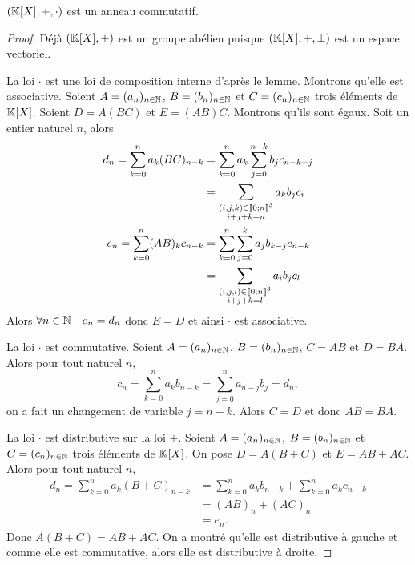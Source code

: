 \begin{theo}
  \((\mathbb{K}[X],+,\cdot)\) est un anneau commutatif.
\end{theo}
\begin{proof}
  Déjà \((\mathbb{K}[X],+)\) est un groupe abélien puisque \((\mathbb{K}[X],+,\perp)\) est un
  espace vectoriel.

  La loi \(\cdot\) est une loi de composition interne d'après le lemme. Montrons
  qu'elle est associative. Soient \(A = (a_n)_{n \in \mathbb{N}}\), \(B = (b_n)_{n \in \mathbb{N}}\)
  et \(C = (c_n)_{n \in \mathbb{N}}\) trois éléments de \(\mathbb{K}[X]\). Soient \(D = A(BC)\) et
  \(E = (AB)C\). Montrons qu'ils sont égaux. Soit un entier naturel \(n\), alors
  \begin{align}
    d_n = \sum_{k = 0}^n a_k (BC)_{n-k} &= \sum_{k = 0}^n a_k \sum_{j = 0}^{n-k} b_j
    c_{n-k-j} \\
    & = \sum_{\substack{(i,j,k)\in \mathopen{\llbracket}0\mathclose{}\mathpunct{};n\mathclose{\rrbracket}^3 \\  i+j+k = n}} a_k b_j
    c_i \\
    e_n = \sum_{k = 0}^n (AB)_k c_{n-k} &= \sum_{k = 0}^n \sum_{j = 0}^{k} a_j
    b_{k-j} c_{n-k} \\
    & = \sum_{\substack{(i,j,l)\in \mathopen{\llbracket}0\mathclose{}\mathpunct{};n\mathclose{\rrbracket}^3 \\  i+j+k = l}} a_i b_j
    c_l \\
  \end{align}
  Alors \(\forall n \in \mathbb{N} \quad e_n = d_n\) donc \(E = D\) et ainsi \(\cdot\) est
  associative.

  La loi \(\cdot\) est commutative. Soient \(A = (a_n)_{n \in \mathbb{N}}\), \(B = (b_n)_{n
  \in \mathbb{N}}\), \(C = AB\) et \(D = BA\). Alors pour tout naturel \(n\),
  \begin{equation}
    c_n = \sum_{k = 0}^n a_k b_{n-k} = \sum_{j = 0}^n a_{n-j} b_{j} =d_n,
  \end{equation}
  on a fait un changement de variable \(j = n-k\). Alors \(C = D\) et donc
  \(AB = BA\).

  La loi \(\cdot\) est distributive sur la loi \(+\). Soient \(A = (a_n)_{n \in
  \mathbb{N}}\), \(B = (b_n)_{n \in \mathbb{N}}\) et \(C = (c_n)_{n \in \mathbb{N}}\) trois éléments de
  \(\mathbb{K}[X]\). On pose \(D = A(B+C)\) et \(E = AB+AC\). Alors pour tout naturel \(n\),
  \begin{align}
    d_n = \sum_{k = 0}^n a_k(B+C)_{n-k} &= \sum_{k = 0}^n a_k b_{n-k} + \sum_{k = 0}^n
    a_k c_{n-k} \\
    & = (AB)_n +(AC)_n \\
    & = e_n.
  \end{align}
  Donc \(A(B+C) = AB+AC\). On a montré qu'elle est distributive à gauche et comme
  elle est commutative, alors elle est distributive à droite.


\end{proof}
